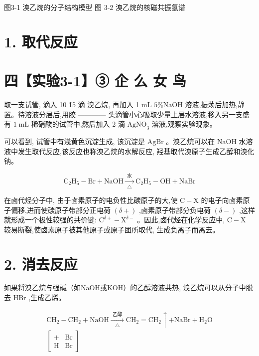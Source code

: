 \documentclass[10pt]{article}
\begin{document}
图3-1 溴乙烷的分子结构模型 图 3-2 溴乙烷的核磁共振氢谱

\section*{1. 取代反应}

\section*{四【实验3-1】③ 企 么 女 鸟}

取一支试管, 滴入 10 \~15 滴 溴乙烷, 再加入 1 mL \(5\% \mathrm{{NaOH}}\) 溶液,振荡后加热,静置。待溶液分层后,用胶 ------------ 头滴管小心吸取少量上层水溶液,移入另一支盛有 \(1\mathrm{\;{mL}}\) 稀硝酸的试管中,然后加入 2 滴 \({\mathrm{{AgNO}}}_{3}\) 溶液,观察实验现象。

可以看到, 试管中有浅黄色沉淀生成, 该沉淀是 \(\mathrm{{AgBr}}\) 。溴乙烷可以在 \(\mathrm{{NaOH}}\) 水溶液中发生取代反应,该反应也称溴乙烷的水解反应, 羟基取代溴原子生成乙醇和溴化钠。

\[
{\mathrm{C}}_{2}{\mathrm{H}}_{5} - \mathrm{{Br}} + \mathrm{{NaOH}}\xrightarrow[\bigtriangleup ]{\text{ 水 }}{\mathrm{C}}_{2}{\mathrm{H}}_{5} - \mathrm{{OH}} + \mathrm{{NaBr}}
\]

在卤代烃分子中, 由于卤素原子的电负性比碳原子的大,使 \(\mathrm{C} - \mathrm{X}\) 的电子向卤素原子偏移,进而使碳原子带部分正电荷 \(\left( {\delta + }\right)\) ,卤素原子带部分负电荷 \(\left( {\delta - }\right)\) ,这样就形成一个极性较强的共价键: \({\mathrm{C}}^{\delta + } - {\mathrm{X}}^{\delta - }\) 。因此,卤代烃在化学反应中, \(\mathrm{C} - \mathrm{X}\) 较易断裂,使卤素原子被其他原子或原子团所取代, 生成负离子而离去。

\section*{2. 消去反应}

如果将溴乙烷与强碱（如NaOH或KOH）的乙醇溶液共热, 溴乙烷可以从分子中脱去 \(\mathrm{{HBr}}\) ,生成乙烯。

\[
\begin{array}{l} {\mathrm{{CH}}}_{2} - {\mathrm{{CH}}}_{2} + \mathrm{{NaOH}}\xrightarrow[\bigtriangleup ]{\text{ 乙醇 }}{\mathrm{{CH}}}_{2} = {\mathrm{{CH}}}_{2} \uparrow + \mathrm{{NaBr}} + {\mathrm{H}}_{2}\mathrm{O} \\ \left\lbrack \begin{array}{ll} + & \mathrm{{Br}} \\ \mathrm{H} & \mathrm{{Br}} \end{array}\right\rbrack \end{array}
\]
\end{document}
